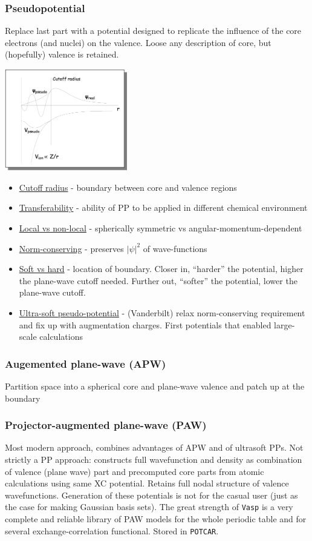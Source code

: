 \documentclass[11pt]{article}
\begin{document}
\subsubsection{Pseudopotential}
\label{sec:org3517dd8}
Replace last part with a potential designed to replicate the influence of the core electrons (and nuclei) on the valence.  Loose any description of core, but (hopefully) valence is retained.

\begin{center}
\includegraphics[width=0.4\textwidth]{./Images/PP.png}
\end{center}

\begin{itemize}
\item \uline{Cutoff radius} - boundary between core and valence regions
\item \uline{Transferability} - ability of PP to be applied in different chemical environment
\item \uline{Local vs non-local} - spherically symmetric vs angular-momentum-dependent
\item \uline{Norm-conserving} - preserves \(|\psi|^2\) of wave-functions
\item \uline{Soft vs hard} - location of boundary. Closer in, ``harder'' the potential, higher the plane-wave cutoff needed.  Further out, ``softer'' the potential, lower the plane-wave cutoff.
\item \uline{Ultra-soft pseudo-potential} - (Vanderbilt)  relax norm-conserving requirement and fix up with augmentation charges. First potentials that enabled large-scale calculations
\end{itemize}
\subsubsection{Augemented plane-wave (APW)}
\label{sec:org641b6d3}
Partition space into a spherical core and plane-wave valence and patch up at the boundary
\subsubsection{Projector-augmented plane-wave (PAW)}
\label{sec:org383ccea}
Most modern approach, combines advantages of APW and of ultrasoft
PPs. Not strictly a PP approach: constructs full wavefunction and
density as combination of valence (plane wave) part and precomputed
core parts from atomic calculations using same XC potential. Retains
full nodal structure of valence wavefunctions.  Generation of these
potentials is not for the casual user (just as the case for making
Gaussian basis sets). The great strength of \texttt{Vasp} is a very complete
and reliable library of PAW models for the whole periodic table and
for several exchange-correlation functional. Stored in \texttt{POTCAR}.
\end{document}

